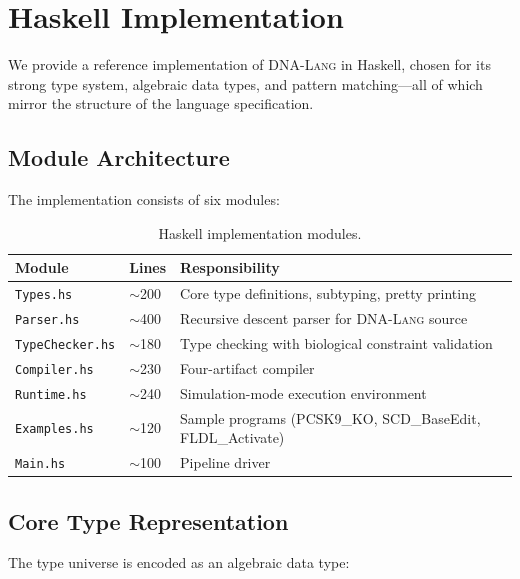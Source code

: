 \documentclass[12pt,a4paper]{article}
\newcommand{\DNALang}{\textsc{DNA-Lang}}
\begin{document}
\section{Haskell Implementation}
\label{sec:implementation}

We provide a reference implementation of \DNALang{} in Haskell, chosen for its strong type system, algebraic data types, and pattern matching---all of which mirror the structure of the language specification.

\subsection{Module Architecture}

The implementation consists of six modules:

\begin{table}[H]
\centering
\caption{Haskell implementation modules.}
\label{tab:modules}
\begin{tabular}{llp{7cm}}
\toprule
\textbf{Module} & \textbf{Lines} & \textbf{Responsibility} \\
\midrule
\texttt{Types.hs}       & $\sim$200 & Core type definitions, subtyping, pretty printing \\
\texttt{Parser.hs}      & $\sim$400 & Recursive descent parser for \DNALang{} source \\
\texttt{TypeChecker.hs} & $\sim$180 & Type checking with biological constraint validation \\
\texttt{Compiler.hs}    & $\sim$230 & Four-artifact compiler \\
\texttt{Runtime.hs}     & $\sim$240 & Simulation-mode execution environment \\
\texttt{Examples.hs}    & $\sim$120 & Sample programs (PCSK9\_KO, SCD\_BaseEdit, FLDL\_Activate) \\
\texttt{Main.hs}        & $\sim$100 & Pipeline driver \\
\bottomrule
\end{tabular}
\end{table}

\subsection{Core Type Representation}

The type universe is encoded as an algebraic data type:
\end{document}
